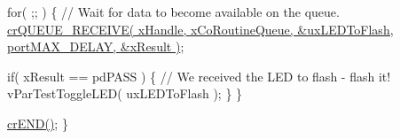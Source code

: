 \begin{DoxyPre}   for( ;; )
   \{
       // Wait for data to become available on the queue.
       \hyperlink{croutine_8h_a586d57fd9a3e2aa5ae66484ed3be36c9}{crQUEUE\_RECEIVE( xHandle, xCoRoutineQueue, &uxLEDToFlash, portMAX\_DELAY, &xResult )};\end{DoxyPre}



\begin{DoxyPre}       if( xResult == pdPASS )
       \{
           // We received the LED to flash - flash it!
           vParTestToggleLED( uxLEDToFlash );
       \}
   \}\end{DoxyPre}



\begin{DoxyPre}   \hyperlink{croutine_8h_ae6038cc976689b50000475ebfc4e2f23}{crEND()};
\}\end{DoxyPre}
 